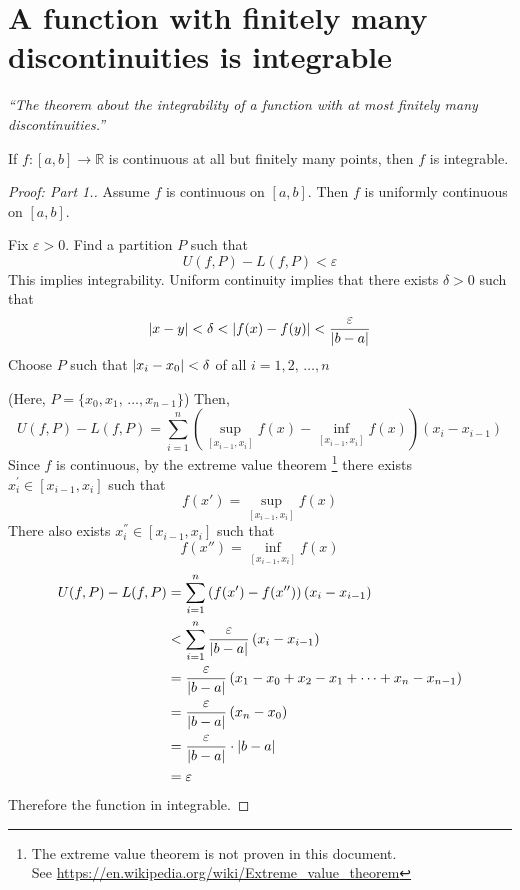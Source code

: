 \documentclass[12pt]{report}
\begin{document}
    \section{A function with finitely many discontinuities is integrable}
    \textit{``The theorem about the integrability of a function with at most finitely many discontinuities.''} \vspace{3mm}
    \begin{theorem}
        If \(f: [a,b] \to \mathbb{R}\) is continuous at all but finitely many points, then \(f\) is integrable.
    \end{theorem}
    \label{Part 1.}
    \begin{proof}[Proof: Part \textnormal{1.}]
        Assume \(f\) is continuous on \([a,b]\). Then \(f\) is uniformly continuous on \([a,b]\).

        Fix \(\varepsilon > 0\). Find a partition \(P\) such that 
        \[U(f,P) - L(f,P) < \varepsilon\]
        This implies integrability. Uniform continuity implies that there exists \(\delta > 0 \) such that
        \[\left| x - y \right| < \delta < \left| f(x) - f(y) \right| < \frac{\varepsilon}{\left| b-a \right|}\]
        Choose \(P\) such that \(\left| x_i - x_0 \right| < \delta\) of all \(i = 1, 2, \, \dots , n\)
        
        (Here, \(P = \{x_0, x_1, \, \dots, x_{n-1}\}\)) Then,
        \[U(f,P) - L(f,P) = \sum^n _{i=1} \left( \underset{[x_{i-1}, x_i]}{\sup} f(x) - \underset{[x_{i-1}, x_i]}{\inf} f(x)\right) \left(x_i - x_{i-1}\right)\]
        Since \(f\) is continuous, by the extreme value theorem \footnote{The extreme value theorem is not proven in this document.\\ See \url{https://en.wikipedia.org/wiki/Extreme_value_theorem}} there exists \(x^{'}_i \in [x_{i-1}, x_i]\) such that
        \[f(x') = \underset{[x_{i-1}, x_i]}{\sup} f(x)\]
        There also exists \(x^{''}_i \in [x_{i-1}, x_i]\) such that
        \[f(x'') = \underset{[x_{i-1}, x_i]}{\inf} f(x)\]
        \begin{align*}
            U(f,P) - L(f,P) &= \sum^n _{i=1} \left( f(x') - f(x'') \right) \left(x_i - x_{i-1}\right)\\
            &< \sum^n _{i=1} \frac{\varepsilon}{\left| b-a \right|} \left(x_i - x_{i-1}\right)\\
            &= \frac{\varepsilon}{\left| b-a \right|} \left(x_1 - x_0 +x_2 - x_1 + \dots + x_n - x_{n-1}\right)\\
            &= \frac{\varepsilon}{\left| b-a \right|} \left(x_n - x_0\right)\\
            &= \frac{\varepsilon}{\left| b-a \right|} \cdot \left| b-a \right|\\
            &= \varepsilon
        \end{align*}
        Therefore the function in integrable.
    \end{proof}
\end{document}
